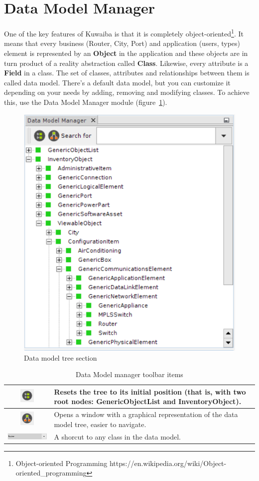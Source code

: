 \documentclass[a4paper]{article}
\begin{document}
	\section{Data Model Manager} \label{sec:data_model_manager}
		One of the key features of Kuwaiba is that it is completely object-oriented\footnote{Object-oriented Programming https://en.wikipedia.org/wiki/Object-oriented\_programming}. It means that every business (Router, City, Port) and application (users, types) element is represented by an \textbf{Object} in the application and these objects are in turn product of a reality abstraction called \textbf{Class}. Likewise, every attribute is a \textbf{Field} in a class. The set of classes, attributes and relationships between them is called data model. There's a default data model, but you can customize it depending on your needs by adding, removing and modifying classes. To achieve this, use the Data Model Manager module (figure~\ref{fig:data_model_manager}).
		\begin{figure}[h!]
			\centering
			\includegraphics[width=0.4\linewidth]{img/data_model_manager.png}
			\caption{Data model tree section}
			\label{fig:data_model_manager}
		\end{figure}
		\begin{table}[h!]
			\centering
			\begin{tabular}{cp{10cm}}
				\includegraphics[width=0.7cm]{img/icon_data_model_default_layout.png} & Resets the tree to its initial position (that is, with two root nodes: \textbf{GenericObjectList} and \textbf{InventoryObject}).\\
				\midrule
				\includegraphics[width=0.7cm]{img/icon_data_model_class_hierarchy_view.png} & Opens a window with a graphical representation of the data model tree,  easier to navigate.\\
				\midrule
				\includegraphics[width=5cm]{img/data_model_manager_search.png} & A shorcut to any class in the data model.\\
			\end{tabular}
			\caption{Data Model manager toolbar items}
			\label{tab:data_model_manager_toolbar_icons}
		\end{table}
\end{document}

